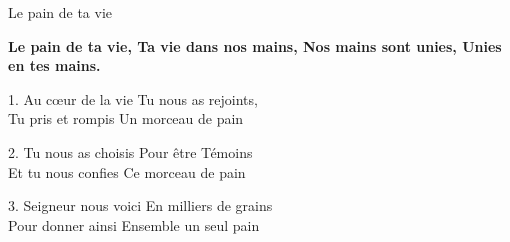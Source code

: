 Le pain de ta vie

\textbf{Le pain de ta vie, Ta vie dans nos mains, Nos mains sont unies, Unies en tes mains.}

1. Au cœur de la vie Tu nous as rejoints,\\
Tu pris et rompis Un morceau de pain

2. Tu nous as choisis Pour être Témoins\\
Et tu nous confies Ce morceau de pain

3. Seigneur nous voici En milliers de grains\\
Pour donner ainsi Ensemble un seul pain


